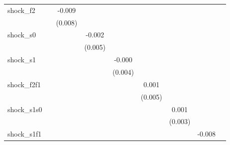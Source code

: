{\begin{tabular}{l*{8}{c}}
\addlinespace
shock\_f2    &                     &      -0.009         &                     &                     &                     &                     &                     &                     \\
            &                     &     (0.008)         &                     &                     &                     &                     &                     &                     \\
\addlinespace
shock\_s0    &                     &                     &      -0.002         &                     &                     &                     &                     &                     \\
            &                     &                     &     (0.005)         &                     &                     &                     &                     &                     \\
\addlinespace
shock\_s1    &                     &                     &                     &      -0.000         &                     &                     &                     &                     \\
            &                     &                     &                     &     (0.004)         &                     &                     &                     &                     \\
\addlinespace
shock\_f2f1  &                     &                     &                     &                     &       0.001         &                     &                     &                     \\
            &                     &                     &                     &                     &     (0.005)         &                     &                     &                     \\
\addlinespace
shock\_s1s0  &                     &                     &                     &                     &                     &       0.001         &                     &                     \\
            &                     &                     &                     &                     &                     &     (0.003)         &                     &                     \\
\addlinespace
shock\_s1f1  &                     &                     &                     &                     &                     &                     &      -0.008         &                     \\

\end{tabular}}
